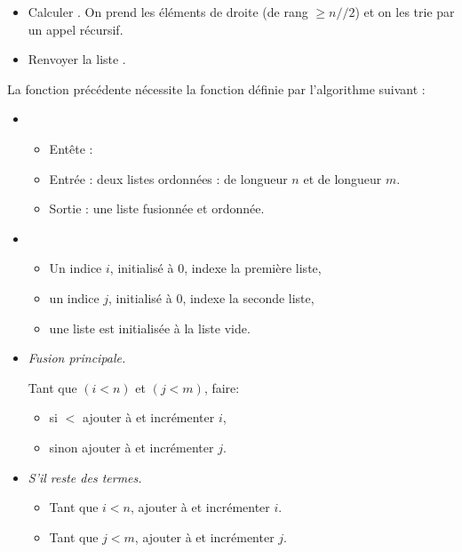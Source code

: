 \documentclass[11pt,class=report,crop=false]{standalone}
\begin{document}
\begin{activite}
\begin{algorithme}
\begin{itemize}
		\item Calculer . On prend les éléments de droite (de rang $\ge n//2$) et on les trie par un appel récursif.
		
		\item Renvoyer la liste .
		
	\end{itemize}
\end{algorithme} 

	La fonction précédente nécessite la fonction définie par l'algorithme suivant :
		\begin{algorithme}
		\sauteligne 
		
		\begin{itemize}
			\item 
			\begin{itemize}
				\item Entête :  
				\item Entrée : deux listes ordonnées :  de longueur $n$ et  de longueur $m$.			
				\item Sortie : une liste fusionnée et ordonnée.				
			\end{itemize}
			
			\item 
			\begin{itemize}
				\item Un indice $i$, initialisé à $0$, indexe la première liste, 
				\item un indice $j$, initialisé à $0$, indexe la seconde liste,
				\item une liste  est initialisée à la liste vide.
			\end{itemize} 
			
			\item \emph{Fusion principale.}
			
			Tant que $(i < n)$ et $(j < m)$, faire:
			\begin{itemize}
				\item si  $<$  ajouter   à  et incrémenter $i$,
				\item sinon  ajouter   à  et incrémenter $j$.
			\end{itemize} 	
			\item \emph{S'il reste des termes.}
			\begin{itemize}
			  \item Tant que $i < n$, ajouter   à  et incrémenter $i$.
			  \item Tant que $j < m$, ajouter   à  et incrémenter $j$.	
			\end{itemize} 			
			

\end{itemize}
\end{algorithme}
\end{activite}
\end{document}
